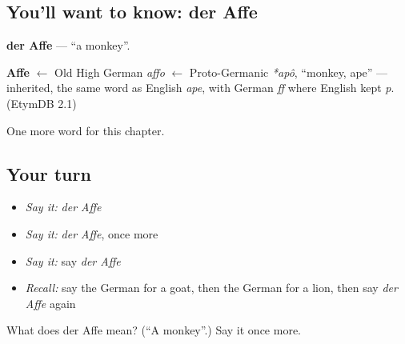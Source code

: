 \subsection*{You'll want to know: der Affe}
\textbf{der Affe} — \textquotedblleft{}a monkey\textquotedblright{}.

\begin{cousinweb}
\textbf{Affe} $\leftarrow$ Old High German \emph{affo} $\leftarrow$ Proto-Germanic \emph{*apô}, \textquotedblleft{}monkey, ape\textquotedblright{} — inherited, the same word as English \emph{ape}, with German \emph{ff} where English kept \emph{p}. (EtymDB 2.1)
\end{cousinweb}

\begin{grammarlens}[title={What you've built}]
One more word for this chapter.
\end{grammarlens}

\subsection*{Your turn}
\begin{itemize}
\raggedright
  \item \emph{Say it:} \emph{der Affe}
  \item \emph{Say it:} \emph{der Affe}, once more
  \item \emph{Say it:} say \emph{der Affe}
  \item \emph{Recall:} say the German for a goat, then the German for a lion, then say \emph{der Affe} again
\end{itemize}

\begin{tcolorbox}[breakable,colback=teal!4,colframe=teal!35!black,title={Before you move on}]
What does der Affe mean? (\textquotedblleft{}A monkey\textquotedblright{}.) Say it once more.
\end{tcolorbox}
